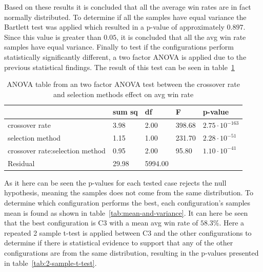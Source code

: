 Based on these results it is concluded that all the average win rates are in fact normally
distributed.
To determine if all the samples have equal variance the Bartlett test was applied which resulted in a 
p-value of approximately $0.897$. Since this value is greater than $0.05$, it is concluded that
 all the avg win rate samples have equal variance.
Finally to test if the configurations perform statistically 
significantly different, a two factor ANOVA is applied 
due to the previous statistical findings. 
The result of this test can be seen in table~\ref{tab:2-factor-anova-table}
\begin{table}[H]
	\begin{center}
		\caption{ANOVA table from an two factor ANOVA test between the crossover rate and selection methods effect on avg win rate}
		\label{tab:2-factor-anova-table}
		\begin{tabular}{|l|l|l|l|l|}
			\hline
			{} &     sum sq &      df &           F &         p-value \\ \hline
			crossover rate                     &   3.98 &     2.00 &  398.68 &   $2.75\cdot 10 ^{-163}$ \\
			selection method                   &   1.15 &     1.00 &  231.70 &   $2.28\cdot 10^{-51}$   \\
			crossover rate:selection method    &   0.95 &     2.00 &   95.80 &   $1.10\cdot 10^{-41}$   \\
			Residual                           &  29.98 &  5994.00 &         &                          \\ \hline
		\end{tabular}
	\end{center}
\end{table}
As it here can be seen the p-values for each tested case rejects the null hypothesis, meaning the 
samples does not come from the same distribution. To determine which configuration performs the best,
each configuration's samples mean is found as shown in table~\ref{tab:mean-and-variance}.
It can here be seen that the best configuration is C3 with a mean avg win rate of $58.3\%$. 
Here a repeated 2 sample t-test is applied between C3 and the other configurations
to determine if there is statistical evidence to support that any of the other configurations 
are from the same distribution, resulting in the p-values presented in table~\ref{tab:2-sample-t-test}.
